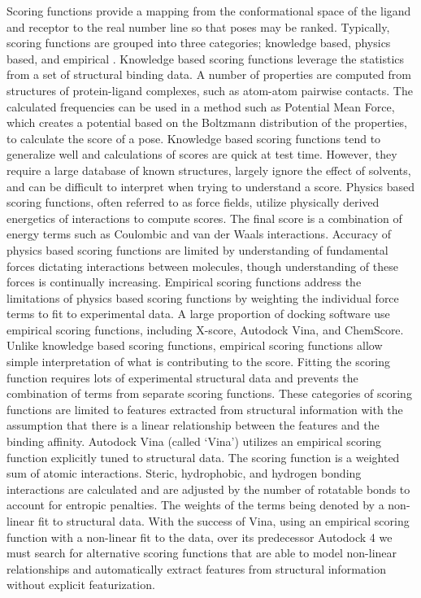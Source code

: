 \documentclass[journal=jcisd8,manuscript=article]{achemso}
\begin{document}
Scoring functions provide a mapping from the conformational space of the ligand and receptor to the real number line so that poses may be ranked. Typically, scoring functions are grouped into three categories; knowledge based, physics based, and empirical \cite{kitchen2004docking}. Knowledge based scoring functions leverage the statistics from a set of structural binding data. A number of properties are computed from structures of protein-ligand complexes, such as atom-atom pairwise contacts. The calculated frequencies can be used in a method such as Potential Mean Force, which creates a potential based on the Boltzmann distribution of the properties, to calculate the score of a pose. Knowledge based scoring functions tend to generalize well and calculations of scores are quick at test time. However, they require a large database of known structures, largely ignore the effect of solvents, and can be difficult to interpret when trying to understand a score\cite{brooijmans2003molecular}. Physics based scoring functions, often referred to as force fields, utilize physically derived energetics of interactions to compute scores. The final score is a combination of energy terms such as Coulombic and van der Waals interactions\cite{huang2006molecular}. Accuracy of physics based scoring functions are limited by understanding of fundamental forces dictating interactions between molecules, though understanding of these forces is continually increasing\cite{liu2015classification}. Empirical scoring functions address the limitations of physics based scoring functions by weighting the individual force terms to fit to experimental data.  A large proportion of docking software use empirical scoring functions, including X-score, Autodock Vina, and ChemScore\cite{wang2002further,trott2010autodock,eldridge1997empirical}. Unlike knowledge based scoring functions, empirical scoring functions allow simple interpretation of what is contributing to the score. Fitting the scoring function requires lots of experimental structural data and prevents the combination of terms from separate scoring functions. These categories of scoring functions are limited to features extracted from structural information with the assumption that there is a linear relationship between the features and the binding affinity. Autodock Vina (called `Vina') utilizes an empirical scoring function explicitly tuned to structural data\cite{trott2010autodock}. The scoring function is a weighted sum of atomic interactions.  Steric, hydrophobic, and hydrogen bonding interactions are calculated and are adjusted by the number of rotatable bonds to account for entropic penalties. The weights of the terms being denoted by a non-linear fit to structural data. With the success of Vina, using an empirical scoring function with a non-linear fit to the data,  over its predecessor Autodock 4\cite{morris1998automated} we must search for alternative scoring functions that are able to model non-linear relationships and automatically extract features from structural information without explicit featurization.
\end{document}
